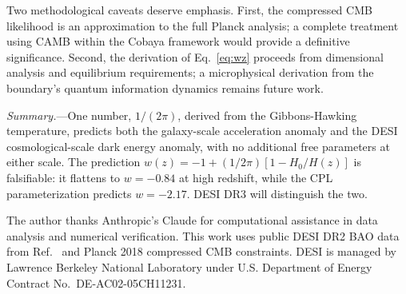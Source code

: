 \documentclass[aps,prl,twocolumn,showpacs,preprintnumbers,amsmath,amssymb,superscriptaddress]{revtex4-2}
\begin{document}
Two methodological caveats deserve emphasis. First, the compressed 
CMB likelihood is an approximation to the full Planck analysis; a 
complete treatment using CAMB within the Cobaya framework would 
provide a definitive significance. Second, the derivation of 
Eq.~\eqref{eq:wz} proceeds from dimensional analysis and equilibrium 
requirements; a microphysical derivation from the boundary's quantum 
information dynamics remains future work.

\textit{Summary.}---One number, $1/(2\pi)$, derived from the 
Gibbons-Hawking temperature, predicts both the galaxy-scale 
acceleration anomaly and the DESI cosmological-scale dark energy 
anomaly, with no additional free parameters at either scale. The prediction 
$w(z) = -1 + (1/2\pi)[1-H_0/H(z)]$ is falsifiable: it flattens to 
$w = -0.84$ at high redshift, while the CPL parameterization predicts 
$w = -2.17$. DESI DR3 will distinguish the two.

\begin{acknowledgments}
The author thanks Anthropic's Claude for computational assistance 
in data analysis and numerical verification. This work uses public 
DESI DR2 BAO data from Ref.~\cite{CobayaSampler} and Planck 2018 
compressed CMB constraints. DESI is managed by Lawrence Berkeley 
National Laboratory under U.S. Department of Energy Contract 
No.\ DE-AC02-05CH11231.
\end{acknowledgments}
\end{document}
